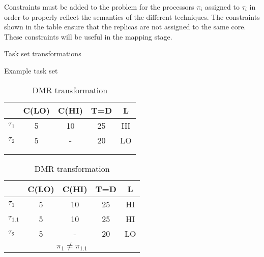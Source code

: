 	Constraints must be added to the problem for the processors $\pi_i$ assigned to $\tau_i$ in order to properly reflect the semantics of the different techniques. 
	The constraints shown in the table ensure that the replicas are not assigned to the same core. 
	These constraints will be useful in the mapping stage.
	
	
\begin{table}
\centering
\caption{Task set transformations}
\label{t:transform}
	\begin{subtable}{0.3\textwidth}
		\caption{Example task set}
		\begin{tabular}{@{}l|cccc@{}}
		\toprule
		& C(LO) & C(HI) & T=D & L 	 \\\bottomrule
		$\tau_1$ & 5 & 10 & 25 & HI  \\
		$\tau_2$ & 5 & - & 20 & LO  \\
		\multicolumn{5}{c}{ } \\
		\multicolumn{5}{c}{ } \\
		\end{tabular}
	\end{subtable} \hspace{2cm}
	\begin{subtable}{0.3\textwidth}
		\caption{DMR transformation}
		\begin{tabular}{@{}l|cccc@{}}
		\toprule
				& C(LO) & C(HI) & T=D & L	 \\\bottomrule
		$\tau_1$ & 5 & 10 & 25 & HI  \\
		$\tau_{1.1}$ & 5 & 10 & 25 & HI  \\
		$\tau_2$ & 5 & - & 20 & LO  \\
		\multicolumn{5}{c}{$\pi_1 \ne \pi_{1.1}$}
		\end{tabular}
	\end{subtable}
	

\end{table}

